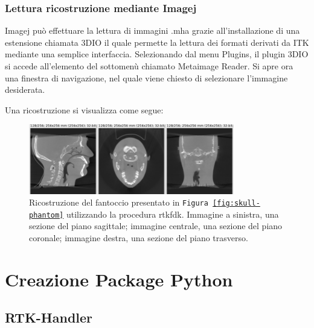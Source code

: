 \documentclass[a4paper,12pt, doubleside]{report}
\begin{document}
            \subsection{Lettura ricostruzione mediante Imagej}
                \par
                    Imagej può effettuare la lettura di immagini .mha grazie all'installazione di una estensione chiamata 3DIO\cite{imagej-3dio-plugin} il quale permette la lettura dei formati derivati da ITK mediante una semplice interfaccia.
                    Selezionando dal menu Plugins, il plugin 3DIO si accede all'elemento del sottomenù chiamato Metaimage Reader. Si apre ora una finestra di navigazione, nel quale viene chiesto di selezionare l'immagine desiderata.
                    
                    Una ricostruzione si visualizza come segue:
                    
                    \begin{figure}[h]
                        
                        \centering
                        \includegraphics[width=0.8\textwidth]{reconstruction}
                        \caption{Ricostruzione del fantoccio presentato in \texttt{Figura \ref{fig:skull-phantom}}
                        utilizzando la procedura rtkfdk. Immagine a sinistra, una sezione del piano sagittale; immagine centrale, una sezione del piano coronale; immagine destra, una sezione del piano trasverso. }
                        \label{fig:reconstruction}
                        
                    \end{figure}
            
            
            
    \chapter{Creazione Package Python}
        \section{RTK-Handler}
\end{document}
